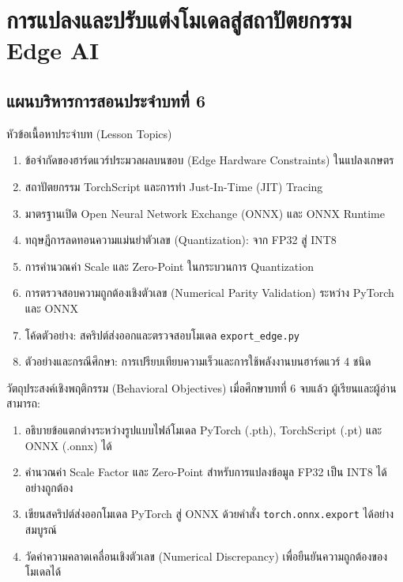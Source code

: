 \chapter{การแปลงและปรับแต่งโมเดลสู่สถาปัตยกรรม Edge AI}
\label{chap:edge_optimization}

\section*{แผนบริหารการสอนประจำบทที่ 6}

\begin{planbox}{หัวข้อเนื้อหาประจำบท (Lesson Topics)}
\begin{enumerate}[leftmargin=1.5em, itemsep=2pt]
    \item ข้อจำกัดของฮาร์ดแวร์ประมวลผลบนขอบ (Edge Hardware Constraints) ในแปลงเกษตร
    \item สถาปัตยกรรม TorchScript และการทำ Just-In-Time (JIT) Tracing
    \item มาตรฐานเปิด Open Neural Network Exchange (ONNX) และ ONNX Runtime
    \item ทฤษฎีการลดทอนความแม่นยำตัวเลข (Quantization): จาก FP32 สู่ INT8
    \item การคำนวณค่า Scale และ Zero-Point ในกระบวนการ Quantization
    \item การตรวจสอบความถูกต้องเชิงตัวเลข (Numerical Parity Validation) ระหว่าง PyTorch และ ONNX
    \item โค้ดตัวอย่าง: สคริปต์ส่งออกและตรวจสอบโมเดล \texttt{export\_edge.py}
    \item ตัวอย่างและกรณีศึกษา: การเปรียบเทียบความเร็วและการใช้พลังงานบนฮาร์ดแวร์ 4 ชนิด
\end{enumerate}
\end{planbox}

\begin{planbox}{วัตถุประสงค์เชิงพฤติกรรม (Behavioral Objectives)}
เมื่อศึกษาบทที่ 6 จบแล้ว ผู้เรียนและผู้อ่านสามารถ:
\begin{enumerate}[leftmargin=1.5em, itemsep=2pt]
    \item อธิบายข้อแตกต่างระหว่างรูปแบบไฟล์โมเดล PyTorch (.pth), TorchScript (.pt) และ ONNX (.onnx) ได้
    \item คำนวณค่า Scale Factor และ Zero-Point สำหรับการแปลงข้อมูล FP32 เป็น INT8 ได้อย่างถูกต้อง
    \item เขียนสคริปต์ส่งออกโมเดล PyTorch สู่ ONNX ด้วยคำสั่ง \texttt{torch.onnx.export} ได้อย่างสมบูรณ์
    \item วัดค่าความคลาดเคลื่อนเชิงตัวเลข (Numerical Discrepancy) เพื่อยืนยันความถูกต้องของโมเดลได้
\end{enumerate}
\end{planbox}

